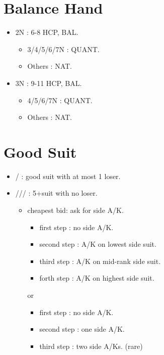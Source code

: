 \documentclass[12pt,twoside,a5paper]{report}%
\begin{document}
	\section*{Balance Hand}
	\begin{itemize}
	\renewcommand{\labelitemi}{}
	\item 2N : 6-8 HCP, BAL.
		\begin{itemize}
		\renewcommand{\labelitemi}{--}
			\item 3/4/5/6/7N : QUANT.
			\item Others : NAT.
		\end{itemize}
	\item 3N : 9-11 HCP, BAL.
		\begin{itemize}
		\renewcommand{\labelitemi}{--}
			\item 4/5/6/7N : QUANT.
			\item Others : NAT.
		\end{itemize}
	\end{itemize}
	\section*{Good Suit}
	\begin{itemize}
	\renewcommand{\labelitemi}{}
	\item {}/\sp{} : good suit with at most 1 loser.
	\item {}/\di{}/\he{}/\sp{} : 5+suit with no loser.
		\begin{itemize}
		\renewcommand{\labelitemi}{--}
		\item cheapest bid: ask for side A/K.
			\begin{itemize}
			\renewcommand{\labelitemi}{--}
				\item first step : no side A/K.
				\item second step : A/K on lowest side suit.
				\item third step : A/K on mid-rank side suit.
				\item forth step : A/K on highest side suit. 
			\end{itemize}
			or
			\begin{itemize}
			\renewcommand{\labelitemi}{--}
				\item first step : no side A/K.
				\item second step : one side A/K.
				\item third step : two side A/Ks. (rare)			
			\end{itemize}
		\end{itemize}
	\end{itemize}
\end{document}
